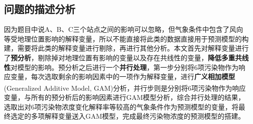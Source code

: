 \documentclass[a4paper,10pt]{my_paper}
\numberwithin{equation}{section}
\begin{document}




\subsection{问题的描述分析}
因为题目中说A、B、C三个站点之间的影响可以忽略，但气象条件中包含了风向等受地理位置影响的解释变量，所以不能直接将此类的数据直接用于预测模型的构建，需要将此类的解释变量进行剔除，再进行其他分析。本文首先对解释变量进行了\textbf{预分析}，剔除掉对地理位置有影响的变量以及存在共线性的变量，\textbf{降低多重共线性}对模型的影响。预分析之后进行一个\textbf{并行处理}，第一步分别将6项污染物作为响应变量，每次选取剩余的影响因素中的一项作为解释变量，进行\textbf{广义相加模型}(Generalized Additive Model, GAM)分析\textsuperscript{\cite{ref5}}，并行步则是分别将6项污染物作为响应变量，与所有的预分析后的影响因素进行GAM模型分析，综合并行处理的结果，选取出对6项污染物浓度变化解释率等较高的气象条件作为预测模型的变量，将最终选定的多项解释变量送入GAM模型，完成最终污染物浓度的预测模型的搭建。

\end{document}
